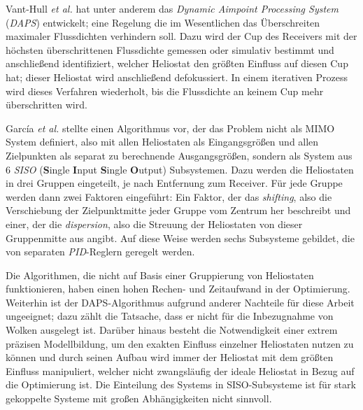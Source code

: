 Vant-Hull \textit{et al.} \cite{VantHull2}\cite{VantHull3} hat unter anderem das \textit{Dynamic Aimpoint Processing System} (\textit{DAPS}) entwickelt; eine Regelung die im Wesentlichen das Überschreiten maximaler Flussdichten verhindern soll.
Dazu wird der Cup des Receivers mit der höchsten überschrittenen Flussdichte gemessen oder simulativ bestimmt und anschließend identifiziert, welcher Heliostat den größten Einfluss auf diesen Cup hat; dieser Heliostat wird anschließend defokussiert.
In einem iterativen Prozess wird dieses Verfahren wiederholt, bis die Flussdichte an keinem Cup mehr überschritten wird.

García \textit{et al.} \cite{Garcia1} stellte einen Algorithmus vor, der das Problem nicht als MIMO System definiert, also mit allen Heliostaten als Eingangsgrößen und allen Zielpunkten als separat zu berechnende Ausgangsgrößen, sondern als System aus 6 \textit{SISO} (\textbf{S}ingle \textbf{I}nput \textbf{S}ingle \textbf{O}utput) Subsystemen.
Dazu werden die Heliostaten in drei Gruppen eingeteilt, je nach Entfernung zum Receiver.
Für jede Gruppe werden dann zwei Faktoren eingeführt: Ein Faktor, der das \textit{shifting}, also die Verschiebung der Zielpunktmitte jeder Gruppe vom Zentrum her beschreibt und einer, der die \textit{dispersion}, also die Streuung der Heliostaten von dieser Gruppenmitte aus angibt.
Auf diese Weise werden sechs Subsysteme gebildet, die von separaten \textit{PID}-Reglern geregelt werden.

Die Algorithmen, die nicht auf Basis einer Gruppierung von Heliostaten funktionieren, haben einen hohen Rechen- und Zeitaufwand in der Optimierung.
Weiterhin ist der DAPS-Algorithmus aufgrund anderer Nachteile für diese Arbeit ungeeignet; dazu zählt die Tatsache, dass er nicht für die Inbezugnahme von Wolken ausgelegt ist.
Darüber hinaus besteht die Notwendigkeit einer extrem präzisen Modellbildung, um den exakten Einfluss einzelner Heliostaten nutzen zu können und durch seinen Aufbau wird immer der Heliostat mit dem größten Einfluss manipuliert, welcher nicht zwangsläufig der ideale Heliostat in Bezug auf die Optimierung ist. \cite[S.35]{DissOberkirsch}
Die Einteilung des Systems in SISO-Subsysteme ist für stark gekoppelte Systeme mit großen Abhängigkeiten nicht sinnvoll. \cite[S.33]{DissZanger}


